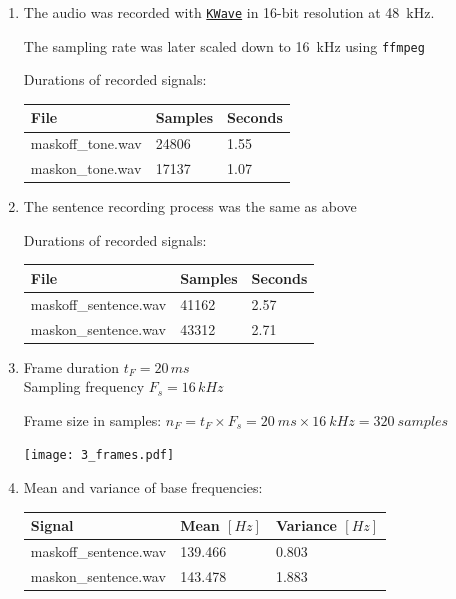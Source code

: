 \documentclass[a4paper, 11pt]{article}
\begin{document}
	\begin{enumerate}
		\item
		The audio was recorded with \texttt{\href{https://apps.kde.org/en/kwave}{KWave}} in 16-bit resolution at 48~kHz.

		The sampling rate was later scaled down to 16~kHz using \texttt{ffmpeg}

		Durations of recorded signals: \\
		\begin{tabular}{ | l | l | l | }
			\hline
			\textbf{File} & \textbf{Samples} & \textbf{Seconds} \\ \hline
			maskoff\_tone.wav & 24806            & 1.55             \\ \hline
			maskon\_tone.wav  & 17137            & 1.07             \\ \hline
		\end{tabular}

		\item
		The sentence recording process was the same as above

		Durations of recorded signals: \\
		\begin{tabular}{ | l | l | l | }
			\hline
			\textbf{File}     & \textbf{Samples} & \textbf{Seconds} \\ \hline
			maskoff\_sentence.wav & 41162            & 2.57             \\ \hline
			maskon\_sentence.wav  & 43312            & 2.71             \\ \hline
		\end{tabular}

		\item
		Frame duration $t_F = 20\,ms$ \\
		Sampling frequency $F_s = 16\,kHz$

		Frame size in samples: $n_F = t_F \times F_s = 20~ms \times 16~kHz = 320~samples$

		\texttt{[image: 3\_frames.pdf]}

		\item
		Mean and variance of base frequencies: \\
		\begin{tabular}{ | l | l | l | }
			\hline
			\textbf{Signal}    & \textbf{Mean} $[Hz]$ & \textbf{Variance} $[Hz]$ \\ \hline
			maskoff\_sentence.wav & 139.466              & 0.803                    \\ \hline
			maskon\_sentence.wav  & 143.478              & 1.883                    \\ \hline
		\end{tabular}


\end{enumerate}
\end{document}
